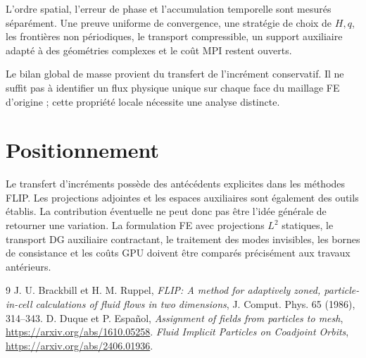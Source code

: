 \documentclass[11pt,a4paper]{article}
\begin{document}
L'ordre spatial, l'erreur de phase et l'accumulation temporelle sont mesurés
séparément. Une preuve uniforme de convergence, une stratégie de choix de
$H,q$, les frontières non périodiques, le transport compressible, un support
auxiliaire adapté à des géométries complexes et le coût MPI restent ouverts.

Le bilan global de masse provient du transfert de l'incrément conservatif.
Il ne suffit pas à identifier un flux physique unique sur chaque face du
maillage FE d'origine ; cette propriété locale nécessite une analyse distincte.

\section{Positionnement}
Le transfert d'incréments possède des antécédents explicites dans les
méthodes FLIP. Les projections adjointes et les espaces auxiliaires sont
également des outils établis. La contribution éventuelle ne peut donc pas
être l'idée générale de retourner une variation. La formulation FE avec
projections $L^2$ statiques, le transport DG auxiliaire contractant, le
traitement des modes invisibles, les bornes de consistance et les coûts GPU
doivent être comparés précisément aux travaux antérieurs.

\begin{thebibliography}{9}
 J. U. Brackbill et H. M. Ruppel,
\emph{FLIP: A method for adaptively zoned, particle-in-cell calculations
of fluid flows in two dimensions}, J. Comput. Phys. 65 (1986), 314--343.
 D. Duque et P. Español,
\emph{Assignment of fields from particles to mesh},
\url{https://arxiv.org/abs/1610.05258}.
 \emph{Fluid Implicit Particles on Coadjoint Orbits},
\url{https://arxiv.org/abs/2406.01936}.
\end{thebibliography}
\end{document}
